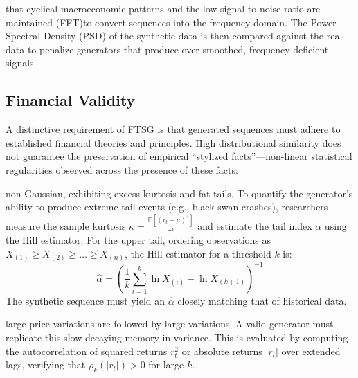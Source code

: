 that cyclical macroeconomic patterns and the low signal-to-noise ratio are maintained (FFT)to convert sequences into the frequency domain. The Power Spectral Density (PSD) of the synthetic data is then compared against the real data to penalize generators that produce over-smoothed, frequency-deficient signals.

\subsection{Financial Validity }
A distinctive requirement of FTSG is that generated sequences must adhere to established financial theories and principles. High distributional similarity does not guarantee the preservation of empirical ``stylized facts''—non-linear statistical regularities observed across the presence of these facts:

non-Gaussian, exhibiting excess kurtosis and fat tails. To quantify the generator's ability to produce extreme tail events (e.g., black swan crashes), researchers measure the sample kurtosis $\kappa = \frac{\mathbb{E}[(r_t - \mu)^4]}{\sigma^4}$ and estimate the tail index $\alpha$ using the Hill estimator. For the upper tail, ordering observations as $X_{(1)} \ge X_{(2)} \ge \dots \ge X_{(n)}$, the Hill estimator for a threshold $k$ is:
    \begin{equation}
        \hat{\alpha} = \left( \frac{1}{k} \sum_{i=1}^k \ln X_{(i)} - \ln X_{(k+1)} \right)^{-1}
    \end{equation}
The synthetic sequence must yield an $\hat{\alpha}$ closely matching that of historical data.

large price variations are followed by large variations. A valid generator must replicate this slow-decaying memory in variance. This is evaluated by computing the autocorrelation of squared returns $r_t^2$ or absolute returns $|r_t|$ over extended lags, verifying that $\rho_k(|r_t|) > 0$ for large $k$.

